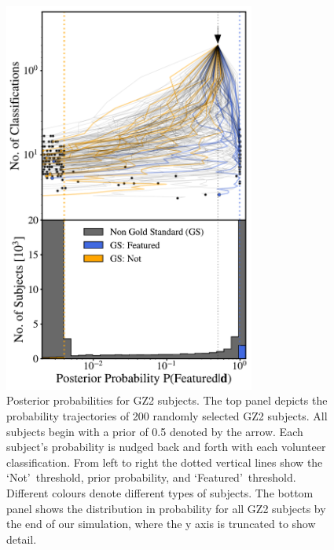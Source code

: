 \documentclass[twocolumn,  trackchanges, ]{aastex6}%
\newcommand{\feat}{`Featured'}
\newcommand{\notfeat}{`Not'}
\begin{document}
\begin{figure}[t!] 
\centering
\includegraphics[width=3.25in]{f3.pdf}
\caption{Posterior probabilities for GZ2 subjects.  The top panel depicts the probability trajectories of 200 randomly selected GZ2 subjects. All subjects begin with a prior of 0.5 denoted by the arrow. Each subject's probability is nudged back and forth with each volunteer classification. From left to right the dotted vertical lines show the \notfeat~threshold, prior probability, and \feat~threshold. Different colours denote different types of subjects. The bottom panel shows the distribution in probability for all GZ2 subjects by the end of our simulation, where the y axis is truncated to show detail.  \label{fig: subject probabilities}}
\end{figure}
\end{document}
